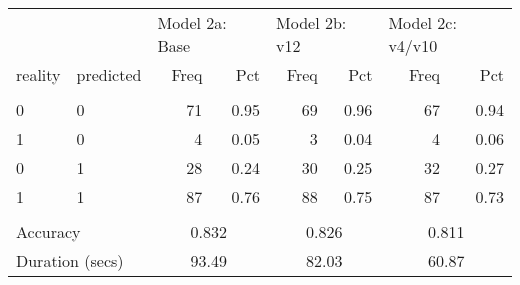 \begin{tabular}{llrrrrrr}
   \toprule 
 & & 
                        \multicolumn{2}{l}{Model 2a: Base} &
                        \multicolumn{2}{l}{Model 2b: v12} &
                        \multicolumn{2}{l}{Model 2c: v4/v10} 
                        \\ 
 \cmidrule(lr){3-4} 
                        \cmidrule(lr){5-6} 
                        \cmidrule(lr){7-8} 
                        
  reality & predicted & 
                        Freq & Pct &
                        Freq & Pct &
                        Freq & Pct 
                        \\ \hline \\[-1.8ex]  
 0 & 0 &  71 & 0.95 &  69 & 0.96 &  67 & 0.94 \\ 
  1 & 0 &   4 & 0.05 &   3 & 0.04 &   4 & 0.06 \\ 
  0 & 1 &  28 & 0.24 &  30 & 0.25 &  32 & 0.27 \\ 
  1 & 1 &  87 & 0.76 &  88 & 0.75 &  87 & 0.73 \\ 
   \hline \\[-1.8ex]  

              \multicolumn{2}{l}{Accuracy} & 
                   \multicolumn{2}{c}{0.832} &
                   \multicolumn{2}{c}{0.826} &
                   \multicolumn{2}{c}{0.811}
                   \\ 
 
                   \multicolumn{2}{l}{Duration (secs)} & 
                   \multicolumn{2}{c}{93.49} &
                   \multicolumn{2}{c}{82.03} &
                   \multicolumn{2}{c}{60.87}
                   \\ 
 \bottomrule 
\end{tabular}
